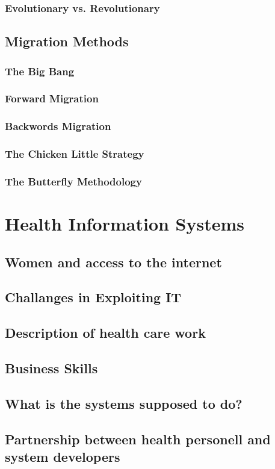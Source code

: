 \subsection{Evolutionary vs. Revolutionary}
\section{Migration Methods}
\subsection{The Big Bang}
\subsection{Forward Migration}
\subsection{Backwords Migration}
\subsection{The Chicken Little Strategy}
\subsection{The Butterfly Methodology}
\chapter{Health Information Systems}
\section{Women and access to the internet \cite{11}}
\section{Challanges in Exploiting IT \cite{4}}
\section{Description of health care work}
\section{Business Skills \cite{4}}
\section{What is the systems supposed to do?}
\section{Partnership between health personell and system developers}
